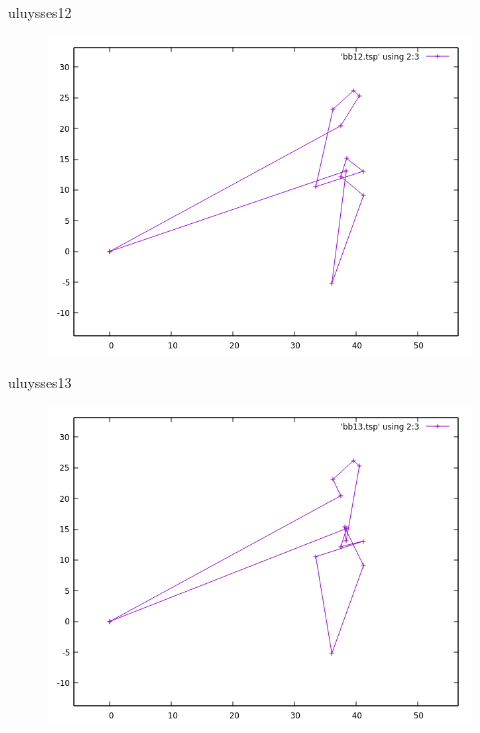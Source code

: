 \documentclass{beamer}
\begin{document}
\begin{frame}[fragile]{uluysses12}
\begin{figure}[H]
\centering
\includegraphics[scale=0.5]{bb12.png}
\end{figure}
\end{frame}

\begin{frame}[fragile]{uluysses13}
\begin{figure}[H]
\centering
\includegraphics[scale=0.5]{bb13.png}
\end{figure}
\end{frame}
\end{document}
